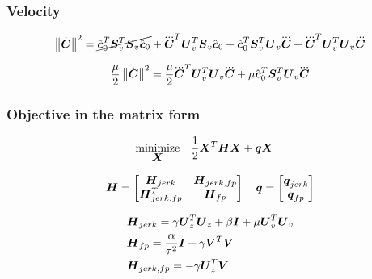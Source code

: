 \subsubsection{Velocity}
\begin{equation*}
    \norm{\cVel}^2 = 
%
%
    \cancel{\cstate_0^T \M{S}_v^T \M{S}_v \cstate_0}
    +    \cJerk^T \M{U}_v^T \M{S}_v \cstate_0
    +    \cstate_0^T \M{S}_v^T \M{U}_v \cJerk
    +    \cJerk^T \M{U}_v^T \M{U}_v \cJerk
\end{equation*}

\begin{equation*}
    \frac{\mu}{2}  \norm{\cVel}^2 = 
        \frac{\mu}{2} \cJerk^T \M{U}_v^T \M{U}_v \cJerk
        +
        \mu \cstate_0^T \M{S}_v^T \M{U}_v \cJerk
\end{equation*}


\subsubsection{Objective in the matrix form}
\begin{equation*}
\begin{split}
    \underset{\mbox{\boldmath $X$}}{\operatorname{minimize}}\quad    & \frac{1}{2} \mbox{\boldmath $X$}^T\mbox{\boldmath $H$}\mbox{\boldmath $X$} + \mbox{\boldmath $q$} \mbox{\boldmath $X$}
\end{split}
\end{equation*}

\begin{equation*}
\mbox{\boldmath $H$} = 
    \begin{bmatrix}
        \mbox{\boldmath $H$}_{jerk}        &   \mbox{\boldmath $H$}_{jerk,fp}\\
        \mbox{\boldmath $H$}_{jerk,fp}^T   &   \mbox{\boldmath $H$}_{fp}
    \end{bmatrix}
\quad
\mbox{\boldmath $q$} = 
    \begin{bmatrix}
        \mbox{\boldmath $q$}_{jerk}\\
        \mbox{\boldmath $q$}_{fp}
    \end{bmatrix}
\end{equation*}

\begin{equation*}
\begin{split}
& \mbox{\boldmath $H$}_{jerk} = 
    \gamma \mbox{\boldmath $U$}_z^T \mbox{\boldmath $U$}_z
    +
    \beta \mbox{\boldmath $I$}
    +
    \mu \mbox{\boldmath $U$}_v^T \mbox{\boldmath $U$}_v\\
& \mbox{\boldmath $H$}_{fp} = 
    \frac{\alpha}{\tau^2} \mbox{\boldmath $I$}
    +
    \gamma \mbox{\boldmath $V$}^T \mbox{\boldmath $V$}\\
& \mbox{\boldmath $H$}_{jerk,fp} = 
    - \gamma \mbox{\boldmath $U$}_z^T \mbox{\boldmath $V$}
\end{split}
\end{equation*}

